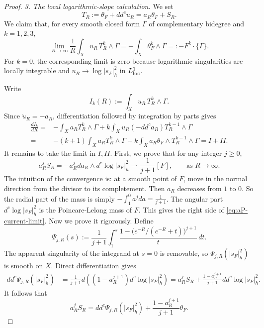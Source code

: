 \documentclass[reqno]{amsart}
\theoremstyle{remark}
\newcommand{\ddc}{dd^c}
\newcommand{\wto}{\rightharpoonup}
\theoremstyle{plain}
\begin{document}
\begin{proof}
\smallskip
\noindent\emph{3. The local logarithmic-slope calculation.} We set \[
T_R:=\theta_F+\ddc u_R=a_R\theta_F+
S_R.
\]
We claim that, for every smooth closed form $\Gamma$ of complementary
bidegree and $k=1,2,3$,
\begin{equation}\label{eq:basic-log-slope}
 \lim_{R\to\infty}\frac1R
  \int_Xu_R\,T_R^k\wedge\Gamma
 =-\int_X\theta_F^k\wedge\Gamma=:-F^k\cdot\{\Gamma\}.
\end{equation}
For $k=0$, the corresponding limit is zero because logarithmic
singularities are locally integrable and $u_R\to\log |s_F|_h^2$ in
$L^1_{\rm loc}$.

Write
\[
 I_k(R):=\int_Xu_R\,T_R^k\wedge\Gamma.
\]
Since $\dot u_R=-a_R$, differentiation followed by integration by
parts gives
\begin{equation}\label{eq:Ik-derivative}
\begin{aligned}
 \frac{dI_k}{dR}
 =&-\int_Xa_RT_R^k\wedge\Gamma+k\int_Xu_R(-\ddc a_R)T_R^{k-1}\wedge\Gamma\\
 =&-(k+1)\int_Xa_RT_R^k\wedge\Gamma+k\int_Xa_R\theta_F\wedge T_R^{k-1}\wedge\Gamma=I+II.
\end{aligned}
\end{equation}
It remains to take the limit in $I,II$. First, we prove that for any integer $j\geq 0$, \begin{equation}\label{eq:aP-current-limit}
    a_R^j S_R=-a_R^jda_R\wedge d^c\log|s_F|_h^2\wto \frac{1}{j+1}[F], \qquad \text{as }R\to \infty.  
\end{equation}
The intuition of the convergence is:  at a smooth point of $F$, move in the normal direction from the divisor to its completement. Then $a_R$ decreases from $1$ to $0$. So the radial part of the mass is simply $-\int_1^0a^jda=\frac{1}{j+1}$. The angular part $d^c\log|s_F|_h^2$ is the Poincare-Lelong mass of $F$. This gives the right side of \eqref{eq:aP-current-limit}. Now we prove it rigorously. Define \[
\Psi_{j,R}(s)
 :=\frac1{j+1}\int_1^s
   \frac{1-\bigl(e^{-R}/(e^{-R}
+t)\bigr)^{j+1}}{t}\,dt.
\]
The apparent singularity of the integrand at $s=0$ is removable, so
$\Psi_{j,R}(|s_F|_h^2)$ is smooth on $X$.  Direct differentiation gives\[\begin{aligned}
 \ddc\Psi_{j,R}(|s_F|_h^2)&=\frac{1}{j+1}d\left((1-a_R^{j+1})d^c\log|s_F|_h^2\right) =a_R^jS_R  +\frac{1-a_R^{j+1}}{j+1}\ddc\log|s_F|_h^2.
\end{aligned}
\]
It follows that \begin{equation}\label{eq:aRS_R-limit}
   a_R^jS_R=\ddc\Psi_{j,R}(|s_F|_h^2)+\frac{1-a_R^{j+1}}{j+1}\theta_F. 
\end{equation}



\end{proof}
\end{document}
